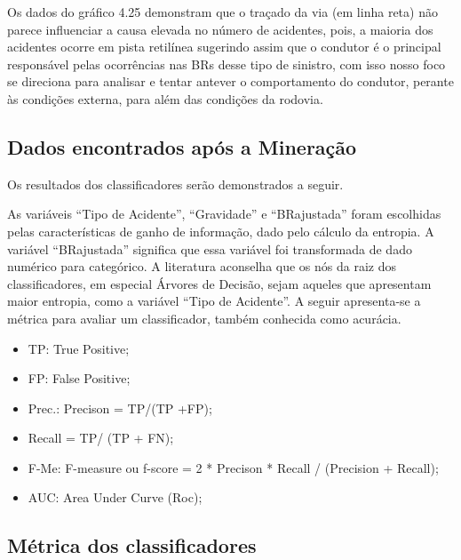 Os dados do gráfico 4.25 demonstram que o traçado da via (em linha reta) não parece influenciar a causa  elevada no número de acidentes, pois, a maioria dos acidentes ocorre em pista retilínea sugerindo assim que o condutor é o principal responsável pelas ocorrências nas BRs desse tipo de sinistro, com isso nosso foco se direciona para analisar e tentar antever o comportamento do condutor, perante às condições externa, para além das condições da rodovia.

\pagebreak



\subsection{Dados encontrados após a Mineração}

Os resultados dos classificadores serão demonstrados a
seguir.

As variáveis “Tipo de Acidente”, “Gravidade” e
“BRajustada” foram escolhidas pelas características de ganho
de informação, dado pelo cálculo da entropia. A variável “BRajustada”
significa que essa variável foi transformada de dado numérico para categórico. A literatura \cite{NorvigRussel2004} aconselha que os nós da raiz dos classificadores, em especial Árvores de Decisão, sejam aqueles que apresentam maior
entropia, como a variável “Tipo de Acidente”.  
A seguir apresenta-se a métrica para avaliar um classificador, também conhecida como acurácia.

\begin{itemize}
	\item TP: True Positive;
	\item FP: False Positive;
	\item Prec.: Precison = TP/(TP +FP);
	\item Recall = TP/ (TP + FN);
	\item F-Me: F-measure ou f-score = 2 * Precison * Recall / (Precision + Recall);
	\item AUC: Area Under Curve (Roc);
\end{itemize}
    
\subsection{Métrica dos classificadores}

